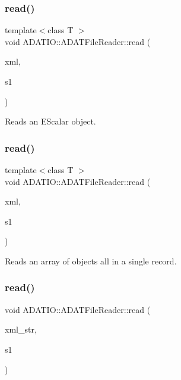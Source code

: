\subsubsection{\texorpdfstring{read()}{read()}\hspace{0.1cm}{\footnotesize\ttfamily [1/4]}}
{\footnotesize\ttfamily template$<$class T $>$ \\
void A\+D\+A\+T\+I\+O\+::\+A\+D\+A\+T\+File\+Reader\+::read (\begin{DoxyParamCaption}\item[{\mbox{\hyperlink{classADATXML_1_1XMLReader}{X\+M\+L\+Reader}} \&}]{xml,  }\item[{\mbox{\hyperlink{classENSEM_1_1EScalar}{E\+Scalar}}$<$ T $>$ \&}]{s1 }\end{DoxyParamCaption})}



Reads an E\+Scalar object. 

\mbox{\label{classADATIO_1_1ADATFileReader_ga32969d6bfdfe9da2912e92d1f0871c20}} 
\subsubsection{\texorpdfstring{read()}{read()}\hspace{0.1cm}{\footnotesize\ttfamily [2/4]}}
{\footnotesize\ttfamily template$<$class T $>$ \\
void A\+D\+A\+T\+I\+O\+::\+A\+D\+A\+T\+File\+Reader\+::read (\begin{DoxyParamCaption}\item[{\mbox{\hyperlink{classADATXML_1_1XMLReader}{X\+M\+L\+Reader}} \&}]{xml,  }\item[{\mbox{\hyperlink{classXMLArray_1_1Array}{Array}}$<$ \mbox{\hyperlink{classENSEM_1_1EScalar}{E\+Scalar}}$<$ T $>$ $>$ \&}]{s1 }\end{DoxyParamCaption})}



Reads an array of objects all in a single record. 

\mbox{\label{classADATIO_1_1ADATFileReader_ga2179348a566e0224ed2122acfabf8bc9}} 
\subsubsection{\texorpdfstring{read()}{read()}\hspace{0.1cm}{\footnotesize\ttfamily [3/4]}}
{\footnotesize\ttfamily void A\+D\+A\+T\+I\+O\+::\+A\+D\+A\+T\+File\+Reader\+::read (\begin{DoxyParamCaption}\item[{std\+::string \&}]{xml\+\_\+str,  }\item[{\mbox{\hyperlink{classADATIO_1_1BinaryBufferReader}{Binary\+Buffer\+Reader}} \&}]{s1 }\end{DoxyParamCaption})}



